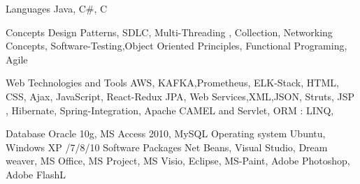 


\begin{cvhonors}

  \cvhonor
    {Languages {\enskip\cdotp\enskip} } %
    {Java, C\#, C} %
    {} %
    {} %


  \cvhonor
    {Concepts {\enskip\cdotp\enskip}} %
    {Design Patterns, SDLC, Multi-Threading , Collection,  Networking Concepts, Software-Testing,Object Oriented Principles,  Functional Programing, Agile } %
    {} %
    {} %
    
  \cvhonor
    {Web Technologies and Tools {\enskip\cdotp\enskip} } %
    {AWS, KAFKA,Prometheus, ELK-Stack, HTML, CSS, Ajax, JavaScript, React-Redux JPA, Web Services,XML,JSON, Struts, JSP , Hibernate, Spring-Integration, Apache CAMEL and Servlet, ORM : LINQ, } %
    {} %
    {} %
    
    
  \cvhonor
    {Database {\enskip\cdotp\enskip} } %
    {Oracle 10g, MS Access 2010, MySQL} %
    {} %
    {} %
  \cvhonor
    {Operating system {\enskip\cdotp\enskip} } %
    {Ubuntu, Windows XP /7/8/10} %
    {} %
    {} %
  \cvhonor
    {Software Packages {\enskip\cdotp\enskip} } %
    {Net Beans, Visual Studio, Dream weaver, MS Office, MS Project, MS Visio, Eclipse, MS-Paint, Adobe Photoshop, Adobe FlashL} %
    {} %
    {} %
\end{cvhonors}

